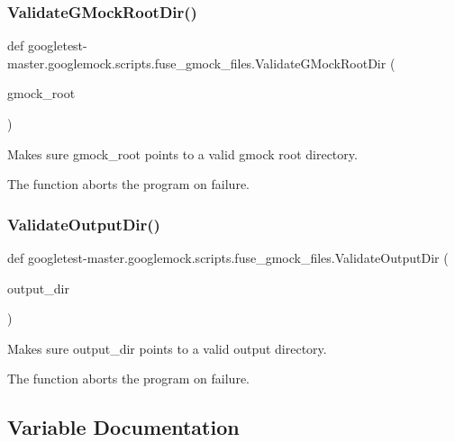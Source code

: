 \subsubsection{\texorpdfstring{ValidateGMockRootDir()}{ValidateGMockRootDir()}}
{\footnotesize\ttfamily def googletest-\/master.\+googlemock.\+scripts.\+fuse\+\_\+gmock\+\_\+files.\+Validate\+G\+Mock\+Root\+Dir (\begin{DoxyParamCaption}\item[{}]{gmock\+\_\+root }\end{DoxyParamCaption})}

\begin{DoxyVerb}Makes sure gmock_root points to a valid gmock root directory.

The function aborts the program on failure.
\end{DoxyVerb}
 \mbox{\label{namespacegoogletest-master_1_1googlemock_1_1scripts_1_1fuse__gmock__files_ac2ebd07cae9a27b8ad5f8bb42d390b4f}} 
\subsubsection{\texorpdfstring{ValidateOutputDir()}{ValidateOutputDir()}}
{\footnotesize\ttfamily def googletest-\/master.\+googlemock.\+scripts.\+fuse\+\_\+gmock\+\_\+files.\+Validate\+Output\+Dir (\begin{DoxyParamCaption}\item[{}]{output\+\_\+dir }\end{DoxyParamCaption})}

\begin{DoxyVerb}Makes sure output_dir points to a valid output directory.

The function aborts the program on failure.
\end{DoxyVerb}
 

\subsection{Variable Documentation}
\mbox{\label{namespacegoogletest-master_1_1googlemock_1_1scripts_1_1fuse__gmock__files_a535148731205b245c9352f9985ffc456}} 
